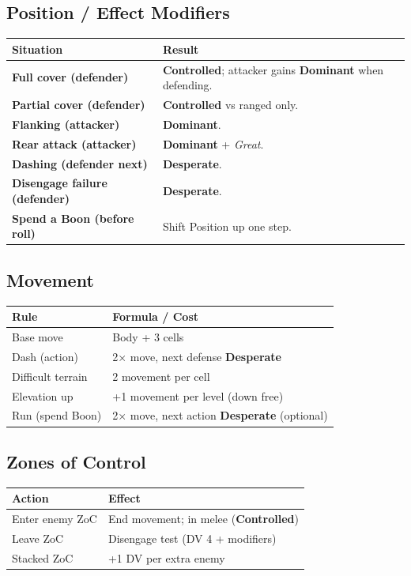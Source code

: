 \documentclass[12pt]{article}
\newcommand{\pos}[1]{\textbf{#1}}
\newcommand{\effect}[1]{\textit{#1}}
\begin{document}
\subsection{Position / Effect Modifiers}
\begin{tabularx}{\linewidth}{@{}>{\bfseries}l X}
\toprule
\textbf{Situation} & \textbf{Result}\\
\midrule
Full cover (defender)          & \pos{Controlled}; attacker gains \pos{Dominant} when defending.\\
Partial cover (defender)       & \pos{Controlled} vs ranged only.\\
Flanking (attacker)            & \pos{Dominant}.\\
Rear attack (attacker)         & \pos{Dominant} + \effect{Great}.\\
Dashing (defender next)        & \pos{Desperate}.\\
Disengage failure (defender)   & \pos{Desperate}.\\
Spend a Boon (before roll)     & Shift Position up one step.\\
\bottomrule
\end{tabularx}

\subsection{Movement}
\begin{tabularx}{\linewidth}{@{}l X}
\toprule
\textbf{Rule} & \textbf{Formula / Cost}\\
\midrule
Base move       & Body + 3 cells\\
Dash (action)   & 2× move, next defense \pos{Desperate}\\
Difficult terrain& 2 movement per cell\\
Elevation up    & +1 movement per level (down free)\\
Run (spend Boon)& 2× move, next action \pos{Desperate} (optional)\\
\bottomrule
\end{tabularx}

\subsection{Zones of Control}
\begin{tabularx}{\linewidth}{@{}l X}
\toprule
\textbf{Action} & \textbf{Effect}\\
\midrule
Enter enemy ZoC & End movement; in melee (\pos{Controlled})\\
Leave ZoC       & Disengage test (DV 4 + modifiers)\\
Stacked ZoC     & +1 DV per extra enemy\\
\bottomrule
\end{tabularx}
\end{document}
